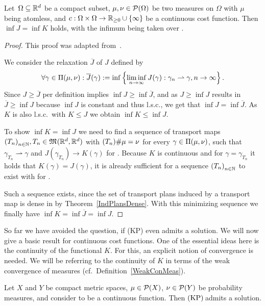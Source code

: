 \begin{theorem}\label{InfCoincide}
	Let $\,\Omega \subseteq \R^d$ be a compact subset, $\mu, \nu \in \PM{\Omega}$ be two measures on $\Omega$ with $\mu$ being atomless, and $\map[c]{\Omega \times \Omega}{\RZero \cup \{ \infty \}}$ be a continuous cost function. Then $\inf J = \inf K$ holds, with the infimum being taken over \TP{\mu}{\nu}.
\end{theorem}

\begin{proof}
	This proof was adapted from\ \cite[the proof of Theorem~1.33 and the memo on relaxations, Box~1.10]{San2015}.

	We consider the relaxation $\overline{J}$ of $J$ defined by
	\[ \forall \gamma \in \TP{\mu}{\nu}: \overline{J}(\gamma) := \inf \left\{ \liminf\limits_{\Ninf} J(\gamma) : \weak{\gamma_n}{\gamma}, \Ninf \right\}. \]
	Since $J \ge \overline{J}$ per definition implies $\inf J \ge \inf \overline{J}$, and as $J \ge \inf J$ results in $\overline{J} \ge \inf J$ because $\inf J$ is constant and thus l.s.c., we get that $\inf J = \inf \overline{J}$. As $K$ is also l.s.c.\ with $K \le J$ we obtain $\inf K \le \inf J$.

	To show $\inf K = \inf J$ we need to find a sequence of transport maps ${(T_n)}_{\NinN}, T_n \in \MF{\R^d}{\R^d}$ with $\push[(T_n)]{\mu} = \nu$ for every $\gamma \in \TP{\mu}{\nu}$, such that $\gamma_{T_n} \rightharpoonup \gamma$ and $J(\gamma_{T_n}) \rightarrow K(\gamma)$ for \Ninf. Because $K$ is continuous and for $\gamma = \gamma_{T_n}$ it holds that $K(\gamma) = J(\gamma)$, it is already sufficient for a sequence ${(T_n)}_{\NinN}$ to exist with  for \Ninf.

	Such a sequence exists, since the set of transport plans induced by a transport map is dense in \TP{\mu}{\nu} by Theorem~\ref{IndPlansDense}. With this minimizing sequence we finally have $\inf K = \inf \overline{J} = \inf J$.
\end{proof}

So far we have avoided the question, if (KP) even admits a solution. We will now give a basic result for continuous cost functions. One of the essential ideas here is the continuity of the functional $K$. For this, an explicit notion of convergence is needed. We will be referring to the continuity of $K$ in terms of the weak convergence of measures (cf.\ Definition~\ref{WeakConMeas}).

\begin{lemma}\label{KPAdmitCompCont}
	Let $X$ and $Y$ be compact metric spaces, $\mu \in \PM{X}$, $\nu \in \PM{Y}$ be probability measures, and consider  to be a continuous function. Then$\text{\normalfont\ (KP)\,}$admits a solution.
\end{lemma}

